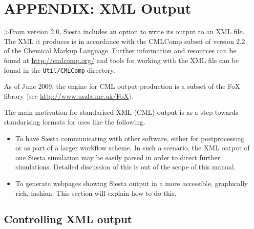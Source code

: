 \documentclass[11pt]{article}
\begin{document}
\newpage
\section{APPENDIX: XML Output}

>From version 2.0, {\sc Siesta} includes an option to write its output to an
XML file. The XML it produces is in accordance with the CMLComp subset of
version 2.2 of the Chemical Markup Language. Further information
and resources can be found at \url{http://cmlcomp.org/} and tools for working
with the XML file can be found in the \texttt{Util/CMLComp} directory.

As of June 2009, the engine for CML output production is a subset of
the FoX library (see \url{http://www.uszla.me.uk/FoX}).

The main motivation for standarised XML (CML) output is as a step
towards standarising formats for uses like the following.

\begin{itemize}

\item To have {\sc Siesta} communicating with other software, either
for postprocessing or as part of a larger workflow scheme. In such a
scenario, the XML output of one {\sc Siesta} simulation may be easily parsed
in order to direct further simulations. Detailed discussion of this is
out of the scope of this manual.

\item To generate webpages showing {\sc Siesta} output in a more accessible,
graphically rich, fashion. This section will explain how to do this.

\end{itemize}

\subsection{Controlling XML output}
\end{document}
